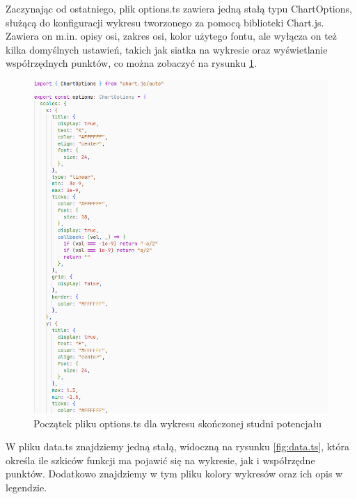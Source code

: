 \documentclass{SGGW-thesis}
\begin{document}
	Zaczynając od ostatniego, plik options.ts zawiera jedną stałą typu ChartOptions, służącą do konfiguracji wykresu tworzonego za pomocą biblioteki Chart.js. Zawiera on m.in. opisy osi, zakres osi, kolor użytego fontu, ale wyłącza on też kilka domyślnych ustawień, takich jak siatka na wykresie oraz wyświetlanie współrzędnych punktów, co można zobaczyć na rysunku \ref{fig:options.ts}.
	
	\begin{figure}[H]
	\includegraphics[width=\textwidth,height=\textheight,keepaspectratio]{options.png} 
	\caption{Początek pliku options.ts dla wykresu skończonej studni potencjału}
	\label{fig:options.ts}
	\end{figure}
	
	 W pliku data.ts znajdziemy jedną stałą, widoczną na rysunku \ref{fig:data.ts}, która określa ile szkiców funkcji ma pojawić się na wykresie, jak i współrzędne punktów. Dodatkowo znajdziemy w tym pliku kolory wykresów oraz ich opis w legendzie.
	
\end{document}
